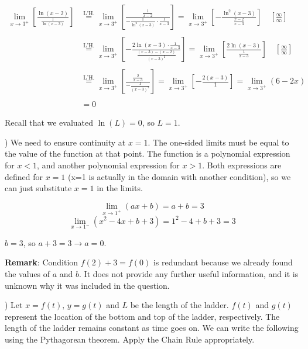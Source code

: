 \documentclass{article}
\begin{document}
\begin{align*}
    \lim_{x\to3^+}\left[\frac{\ln(x-2)}{\frac{1}{\ln(x-3)}}\right] &\overset{\text{L'H.}}{=} \lim_{x\to3^+} \left[\frac{\frac{1}{x-2}}{-\frac{1}{\ln^2(x-3)}\cdot {\frac{1}{x-3}}}\right] = \lim_{x\to3^+} \left[-\frac{\ln^2(x-3)}{\frac{x-2}{x-3}}\right] \quad \left[\frac{\infty}{\infty}\right] \\\\
    &\overset{\text{L'H.}}{=} \lim_{x\to3^+}\left[-\frac{2\ln(x-3)\cdot\frac{1}{x-3}}{\frac{(x-3) -(x-2)}{(x-3)^2}}\right] = \lim_{x\to3^+} \left[\frac{2\ln(x-3)}{\frac{1}{x-3}}\right] \quad \left[\frac{\infty}{\infty}\right] \\\\
    &\overset{\text{L'H.}}{=} \lim_{x\to3^+} \left[\frac{\frac{2}{x-3}}{-\frac{1}{(x-3)^2}}\right] = \lim_{x\to3^+} \left[-\frac{2(x-3)}{1}\right] = \lim_{x\to3^+} (6-2x)\\\\&=0
\end{align*}

\hfill

\noindent Recall that we evaluated $\ln(L) = 0$, so $\boxed{L = 1}$.

\hfill

) We need to ensure continuity at $x=1$. The one-sided limits must be equal to the value of the function at that point. The function is a polynomial expression for $x<1$, and another polynomial expression for $x>1$. Both expressions are defined for $x=1$ (x=1 is actually in the domain with another condition), so we can just substitute $x=1$ in the limits.

\begin{equation*}\lim_{x\to1^+} (ax+b) = a+b = 3\end{equation*}
\begin{equation*}\lim_{x\to1^-} (x^2-4x+b+3) = 1^2 -4 +b+3 =  3\end{equation*}

\noindent $\boxed{b=3}$, so $a+3 = 3\rightarrow \boxed{a = 0}$.

\hfill

\noindent \textbf{Remark}: Condition $f(2) + 3 = f(0)$ is redundant because we already found the values of $a$ and $b$. It does not provide any further useful information, and it is unknown why it was included in the question.

\hfill

) Let $x = f(t), \,y = g(t)$ and $L$ be the length of the ladder. $f(t)$ and $g(t)$ represent the location of the bottom and top of the ladder, respectively. The length of the ladder remains constant as time goes on. We can write the following using the Pythagorean theorem. Apply the Chain Rule appropriately.
\end{document}
